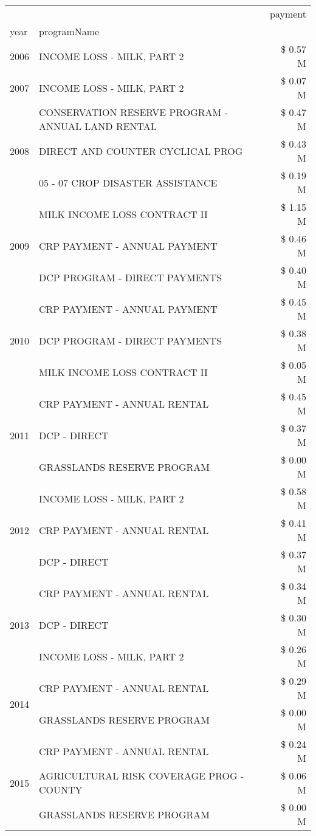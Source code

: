 \begin{tabular}{llr}
\toprule
 &  & payment \\
year & programName &  \\
\midrule
2006 & INCOME LOSS - MILK, PART 2 & \$ 0.57 M \\
\cline{1-3}
2007 & INCOME LOSS - MILK, PART 2 & \$ 0.07 M \\
\cline{1-3}
\multirow[t]{3}{*}{2008} & CONSERVATION RESERVE PROGRAM - ANNUAL LAND RENTAL & \$ 0.47 M \\
 & DIRECT AND COUNTER CYCLICAL PROG & \$ 0.43 M \\
 & 05 - 07 CROP DISASTER ASSISTANCE & \$ 0.19 M \\
\cline{1-3}
\multirow[t]{3}{*}{2009} & MILK INCOME LOSS CONTRACT II & \$ 1.15 M \\
 & CRP PAYMENT - ANNUAL PAYMENT & \$ 0.46 M \\
 & DCP PROGRAM - DIRECT PAYMENTS & \$ 0.40 M \\
\cline{1-3}
\multirow[t]{3}{*}{2010} & CRP PAYMENT - ANNUAL PAYMENT & \$ 0.45 M \\
 & DCP PROGRAM - DIRECT PAYMENTS & \$ 0.38 M \\
 & MILK INCOME LOSS CONTRACT II & \$ 0.05 M \\
\cline{1-3}
\multirow[t]{3}{*}{2011} & CRP PAYMENT - ANNUAL RENTAL & \$ 0.45 M \\
 & DCP - DIRECT & \$ 0.37 M \\
 & GRASSLANDS RESERVE PROGRAM & \$ 0.00 M \\
\cline{1-3}
\multirow[t]{3}{*}{2012} & INCOME LOSS - MILK, PART 2 & \$ 0.58 M \\
 & CRP PAYMENT - ANNUAL RENTAL & \$ 0.41 M \\
 & DCP - DIRECT & \$ 0.37 M \\
\cline{1-3}
\multirow[t]{3}{*}{2013} & CRP PAYMENT - ANNUAL RENTAL & \$ 0.34 M \\
 & DCP - DIRECT & \$ 0.30 M \\
 & INCOME LOSS - MILK, PART 2 & \$ 0.26 M \\
\cline{1-3}
\multirow[t]{2}{*}{2014} & CRP PAYMENT - ANNUAL RENTAL & \$ 0.29 M \\
 & GRASSLANDS RESERVE PROGRAM & \$ 0.00 M \\
\cline{1-3}
\multirow[t]{3}{*}{2015} & CRP PAYMENT - ANNUAL RENTAL & \$ 0.24 M \\
 & AGRICULTURAL RISK COVERAGE PROG - COUNTY & \$ 0.06 M \\
 & GRASSLANDS RESERVE PROGRAM & \$ 0.00 M \\

\end{tabular}
